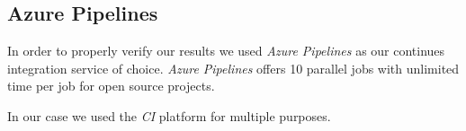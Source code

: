 \subsection{Azure Pipelines}

In order to properly verify our results we used \textit{Azure Pipelines} as our continues integration service
of choice. \textit{Azure Pipelines} offers 10 parallel jobs with unlimited time per job for
open source projects. \cite{azure-pipelines-devop}

In our case we used the \textit{CI} platform for multiple purposes.
